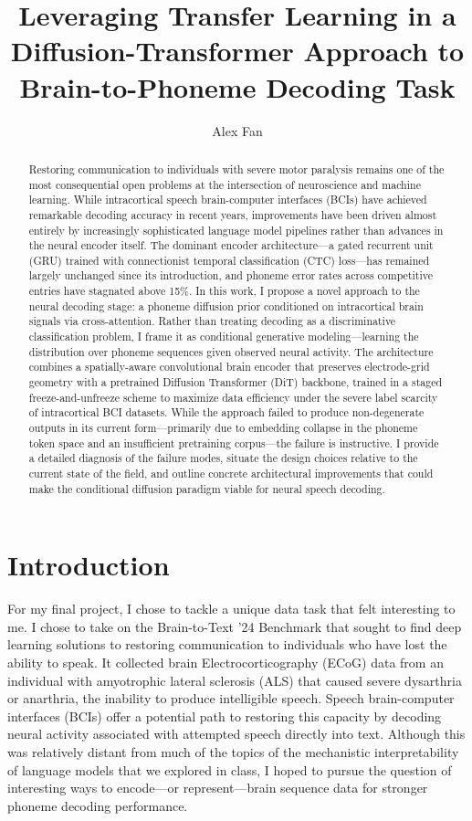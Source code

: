 \documentclass{article}
\title{Leveraging Transfer Learning in a Diffusion-Transformer Approach to Brain-to-Phoneme Decoding Task}
\date{}
\author[1]{Alex Fan}
\affil[1]{The University of Chicago}
\begin{document}
\maketitle

\begin{abstract}
Restoring communication to individuals with severe motor paralysis remains one of the most
consequential open problems at the intersection of neuroscience and machine learning.
While intracortical speech brain-computer interfaces (BCIs) have achieved remarkable
decoding accuracy in recent years, improvements have been driven almost entirely by
increasingly sophisticated language model pipelines rather than advances in the neural
encoder itself. The dominant encoder architecture---a gated recurrent unit (GRU) trained
with connectionist temporal classification (CTC) loss---has remained largely unchanged
since its introduction, and phoneme error rates across competitive entries have stagnated
above 15\%. In this work, I propose a novel approach to the neural decoding stage: a
phoneme diffusion prior conditioned on intracortical brain signals via cross-attention.
Rather than treating decoding as a discriminative classification problem, I frame it as
conditional generative modeling---learning the distribution over phoneme sequences given
observed neural activity. The architecture combines a spatially-aware convolutional brain
encoder that preserves electrode-grid geometry with a pretrained Diffusion Transformer
(DiT) backbone, trained in a staged freeze-and-unfreeze scheme to maximize data
efficiency under the severe label scarcity of intracortical BCI datasets. While the
approach failed to produce non-degenerate outputs in its current form---primarily due to
embedding collapse in the phoneme token space and an insufficient pretraining corpus---the
failure is instructive. I provide a detailed diagnosis of the failure modes, situate the
design choices relative to the current state of the field, and outline concrete
architectural improvements that could make the conditional diffusion paradigm viable for
neural speech decoding.
\end{abstract}

\section{Introduction}

For my final project, I chose to tackle a unique data task that felt interesting to me. I chose
to take on the Brain-to-Text '24 Benchmark that sought to find deep learning solutions to
restoring communication to individuals who have lost the ability to speak. It collected brain
Electrocorticography (ECoG) data from an individual with amyotrophic lateral sclerosis (ALS)
that caused severe dysarthria or anarthria, the inability to produce intelligible speech. Speech
brain-computer interfaces (BCIs) offer a potential path to restoring this capacity by decoding
neural activity associated with attempted speech directly into text. Although this was
relatively distant from much of the topics of the mechanistic interpretability of language
models that we explored in class, I hoped to pursue the question of interesting ways to
encode---or represent---brain sequence data for stronger phoneme decoding performance.
\end{document}
